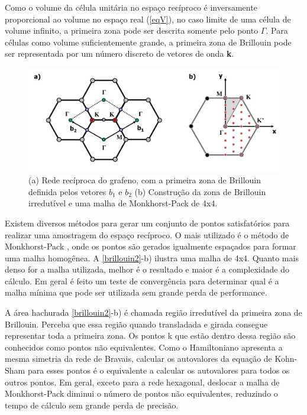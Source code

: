 		Como o volume da célula unitária no espaço recíproco é inversamente proporcional ao volume no espaço real (\autoref{eqV}), no caso limite de uma célula de volume infinito, a primeira zona pode ser descrita somente pelo ponto $\Gamma$. Para células como volume suficientemente grande, a primeira zona de Brillouin pode ser representada por um número discreto de vetores de onda \textbf{k}. 
				
		\begin{figure}[!htb]
			\centering
			\includegraphics[scale=0.4]{capitulos/fig/intro/brillouin2}
			\caption{(a) Rede recíproca do grafeno, com a primeira zona de Brillouin definida pelos vetores $b_{1}$ e $b_{2}$ (b) Construção da zona de Brillouin irredutível e uma malha de Monkhorst-Pack de 4x4.}
			\label{brillouin2}
		\end{figure}
	
		Existem diversos métodos para gerar um conjunto de pontos satisfatórios para realizar uma amostragem do espaço recíproco. O mais utilizado é o método de Monkhorst-Pack \cite{monkhorst1976special}, onde os pontos são gerados igualmente espaçados para formar uma malha homogênea. A \autoref{brillouin2}-b) ilustra uma malha de 4x4. Quanto mais denso for a malha utilizada, melhor é o resultado e maior é a complexidade do cálculo. Em geral é feito um teste de convergência para determinar qual é a malha mínima que pode ser utilizada sem grande perda de performance. 
		
		A área hachurada \autoref{brillouin2}-b) é chamada região irredutível da primeira zona de Brillouin. Perceba que essa região quando transladada e girada consegue representar toda a primeira zona. Os pontos k que estão dentro dessa região são conhecidos como pontos não equivalentes. Como o Hamiltoniano apresenta a mesma simetria da rede de Bravais, calcular os autovalores da equação de Kohn-Sham para esses pontos é o equivalente a calcular os autovalores para todos os outros pontos. Em geral, exceto para a rede hexagonal, deslocar a malha de Monkhorst-Pack diminui o número de pontos não equivalentes, reduzindo o tempo de cálculo sem grande perda de precisão.


